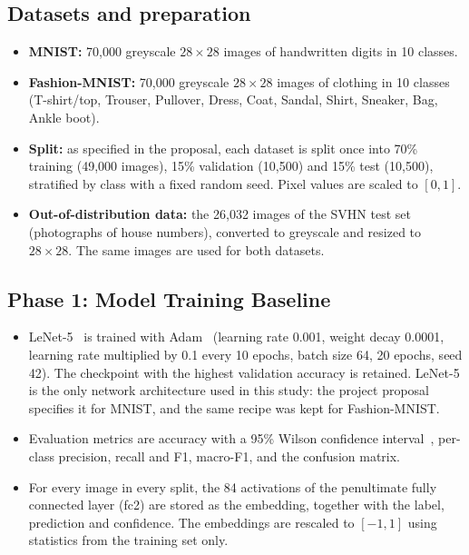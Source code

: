 \documentclass{scrartcl}
\begin{document}
\subsection{Datasets and preparation}

\begin{itemize}
  \item \textbf{MNIST:} 70,000 greyscale $28\times28$ images of handwritten digits in 10 classes.
  \item \textbf{Fashion-MNIST:} 70,000 greyscale $28\times28$ images of clothing in 10 classes (T-shirt/top, Trouser, Pullover, Dress, Coat, Sandal, Shirt, Sneaker, Bag, Ankle boot).
  \item \textbf{Split:} as specified in the proposal, each dataset is split once into 70\% training (49,000 images), 15\% validation (10,500) and 15\% test (10,500), stratified by class with a fixed random seed. Pixel values are scaled to $[0,1]$.
  \item \textbf{Out-of-distribution data:} the 26,032 images of the SVHN test set~\cite{netzer2011reading} (photographs of house numbers), converted to greyscale and resized to $28\times28$. The same images are used for both datasets.
\end{itemize}

\subsection{Phase 1: Model Training Baseline}

\begin{itemize}
  \item LeNet-5~\cite{lecun1998gradient} is trained with Adam~\cite{kingma2015adam} (learning rate 0.001, weight decay 0.0001, learning rate multiplied by 0.1 every 10 epochs, batch size 64, 20 epochs, seed 42). The checkpoint with the highest validation accuracy is retained. LeNet-5 is the only network architecture used in this study: the project proposal specifies it for MNIST, and the same recipe was kept for Fashion-MNIST.
  \item Evaluation metrics are accuracy with a 95\% Wilson confidence interval~\cite{wilson1927probable}, per-class precision, recall and F1, macro-F1, and the confusion matrix.
  \item For every image in every split, the 84 activations of the penultimate fully connected layer (fc2) are stored as the embedding, together with the label, prediction and confidence. The embeddings are rescaled to $[-1,1]$ using statistics from the training set only.
\end{itemize}
\end{document}
